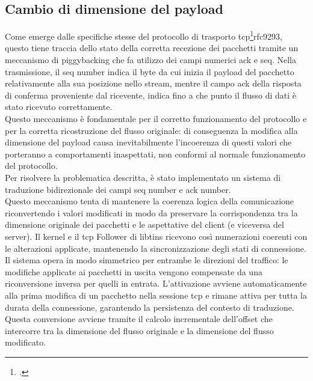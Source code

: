 \subsection{Cambio di dimensione del payload}

Come emerge dalle specifiche stesse del protocollo di trasporto \gls{tcp}\footcite{RFC9293, Transmission Control Protocol (TCP)}{rfc9293}, questo tiene traccia dello stato della corretta recezione dei pacchetti tramite un meccanismo di piggybacking che fa utilizzo dei campi numerici \gls{ack} e \gls{seq}.
Nella trasmissione, il \gls{seq} number indica il byte da cui inizia il payload del pacchetto relativamente alla sua posizione nello stream, mentre il campo \gls{ack} della risposta di conferma proveniente dal ricevente, indica fino a che punto il flusso di dati è stato ricevuto correttamente.\\
Questo meccanismo è fondamentale per il corretto funzionamento del protocollo e per la corretta ricostruzione del flusso originale: di conseguenza la modifica alla dimensione del payload causa inevitabilmente l'incoerenza di questi valori che porteranno a comportamenti inaspettati, non conformi al normale funzionamento del protocollo.\\

Per risolvere la problematica descritta, è stato implementato un sistema di traduzione bidirezionale dei campi \gls{seq} number e \gls{ack} number.\\
Questo meccanismo tenta di mantenere la coerenza logica della comunicazione riconvertendo i valori modificati in modo da preservare la corrispondenza tra la dimensione originale dei pacchetti e le aspettative del client (e viceversa del server).
Il kernel e il \gls{tcp} Follower di libtins ricevono così numerazioni coerenti con le alterazioni applicate, mantenendo la sincronizzazione degli stati di connessione.
Il sistema opera in modo simmetrico per entrambe le direzioni del traffico: le modifiche applicate ai pacchetti in uscita vengono compensate da una riconversione inversa per quelli in entrata. L'attivazione avviene automaticamente alla prima modifica di un pacchetto nella sessione \gls{tcp} e rimane attiva per tutta la durata della connessione, garantendo la persistenza del contesto di traduzione.\\
Questa conversione avviene tramite il calcolo incrementale dell'offset che intercorre tra la dimensione del flusso originale e la dimensione del flusso modificato.

